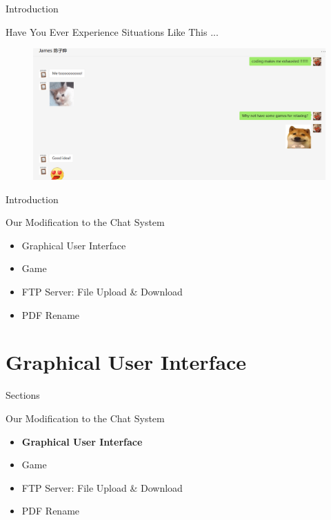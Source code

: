 \documentclass[a4paper,10pt]{beamer}
\begin{document}
\begin{frame}{Introduction}
\begin{block}{Have You Ever Experience Situations Like This ... }
\begin{figure}[H]
    \includegraphics[width=\textwidth]{game123.png}
\end{figure}
\end{block}
\end{frame}

\begin{frame}{Introduction}
\begin{block}{Our Modification to the Chat System}
\begin{itemize}
		\item Graphical User Interface
		\item Game
		\item FTP Server: File Upload \& Download
		\item PDF Rename
\end{itemize}
\end{block}
\end{frame}


\section{Graphical User Interface}
\begin{frame}{Sections}
\begin{block}{Our Modification to the Chat System}
\begin{itemize}
		\item \textbf{Graphical User Interface}
		\item Game
		\item FTP Server: File Upload \& Download
		\item PDF Rename
\end{itemize}
\end{block}
\end{frame}
\end{document}
